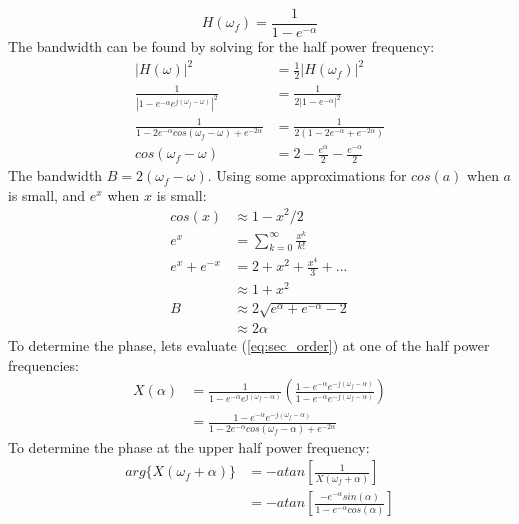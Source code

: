\documentclass{article}
\begin{document}
\begin{equation}
H(\omega_f) = \frac{1}{1-e^{-\alpha}}	
\end{equation}
The bandwidth can be found by solving for the half power frequency:
\begin{equation}
\begin{split}
|H(\omega)|^2 &= \frac{1}{2}|H(\omega_f)|^2 \\
\frac{1}{|1 - e^{-\alpha}e^{j (\omega_f - \omega)}|^2} &= \frac{1}{2|1-e^{-\alpha}|^2} \\
\frac{1}{1 - 2e^{-\alpha}cos(\omega_f - \omega) + e^{-2\alpha}} &= \frac{1}{2(1-2e^{-\alpha} + e^{-2 \alpha})} \\
cos(\omega_f - \omega) &= 2 - \frac{e^{\alpha}}{2} - \frac{e^{-\alpha}}{2}
\end{split}
\end{equation}
The bandwidth $B=2(\omega_f - \omega)$.  Using some approximations for $cos(a)$ when $a$ is small, and $e^x$ when $x$ is small:
\begin{equation}
\begin{split}
cos(x) &\approx 1-x^2/2 \\
e^x &= \sum_{k=0}^{\infty}\frac{x^k}{k!} \\
e^x + e^{-x} &= 2 + x^2 + \frac{x^4}{3} + ... \\
             &\approx 1 + x^2     \\
B &\approx 2\sqrt{e^\alpha+e^{-\alpha}-2} \\
  &\approx 2\alpha
\end{split}
\end{equation}
To determine the phase, lets evaluate (\ref{eq:sec_order}) at one of the half power frequencies:
\begin{equation}
\begin{split}
X(\alpha) &= \frac{1}{1 - e^{-\alpha}e^{j (\omega_f - \alpha)}} \left(\frac{1 - e^{-\alpha}e^{-j (\omega_f - \alpha)}}{1 - e^{-\alpha}e^{-j (\omega_f - \alpha)}} \right)\\
         &= \frac{1 - e^{-\alpha}e^{-j (\omega_f - \alpha)}}{1-2e^{-\alpha}cos(\omega_f-\alpha) + e^{-2\alpha}}
\end{split}
\end{equation}
To determine the phase at the upper half power frequency:
\begin{equation}
\begin{split}
arg\{X(\omega_f + \alpha)\} &= -atan\left[\frac{1}{X(\omega_f+\alpha)}\right] \\
                 &= - atan\left[\frac{-e^{-\alpha}sin(\alpha)}{1-e^{-\alpha} cos(\alpha)}\right]
\end{split}
\end{equation}
\end{document}
